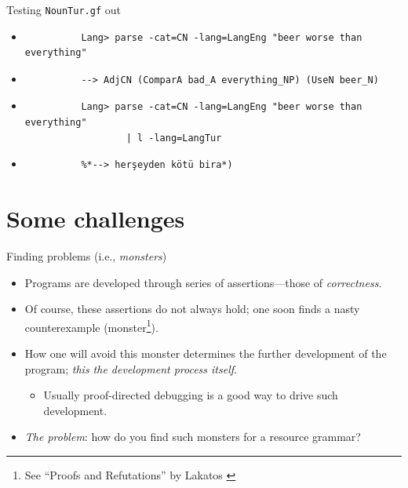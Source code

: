 \documentclass{beamer}
\begin{document}
  \begin{frame}[fragile]{Testing \texttt{NounTur.gf} out}
    \begin{itemize}
      \item<1->
        \begin{lstlisting}
          Lang> parse -cat=CN -lang=LangEng "beer worse than everything"
        \end{lstlisting}
      \item<2->
        \begin{lstlisting}
          --> AdjCN (ComparA bad_A everything_NP) (UseN beer_N)
        \end{lstlisting}
      \item<3->
        \begin{lstlisting}
          Lang> parse -cat=CN -lang=LangEng "beer worse than everything"
                  | l -lang=LangTur
        \end{lstlisting}
      \item<4->
        \begin{lstlisting}
          %*--> herşeyden kötü bira*)
        \end{lstlisting}
    \end{itemize}
  \end{frame}

  \section{Some challenges}

  \begin{frame}{Finding problems (i.e., \emph{monsters})}
    \begin{itemize}
      \item<1-> Programs are developed through series of assertions---those
        of \emph{correctness}.
      \item<2-> Of course, these assertions do not always hold; one soon finds a
        nasty counterexample (monster\footnote{See ``Proofs and Refutations''
        by Lakatos \cite{lakatos1976proofs}}).
      \item<4-> How one will avoid this monster determines the further
        development of the program; \emph{this the development process itself}.
          \begin{itemize}
            \item<3-> Usually \alert{proof-directed debugging}
              \cite{harper1999proof} is a good way to drive such development.
          \end{itemize}
      \item<5-> \emph{The problem}: how do you find such monsters for a resource
        grammar?
    \end{itemize}
  \end{frame}
\end{document}
